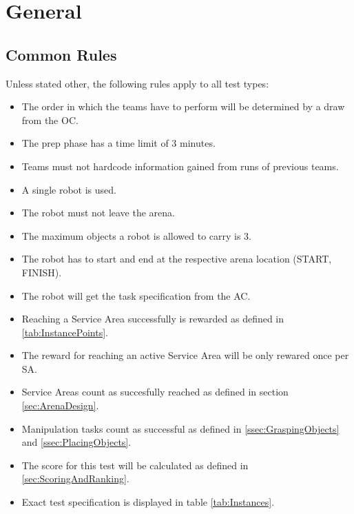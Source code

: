\label{sec:Tests}

\section{General}

\subsection{Common Rules}
\label{ssec: Common Rules}


Unless stated other, the following rules apply to all test types:

\begin{itemize}
\item The order in which the teams have to perform will be determined by a draw from the OC.
\item The prep phase has a time limit of 3 minutes.
\item Teams must not hardcode information gained from runs of previous teams.
\item A single robot is used.
\item The robot must not leave the arena.
\item The maximum objects a robot is allowed to carry is 3.
\item The robot has to start and end at the respective arena location (START, FINISH).
\item The robot will get the task specification from the AC.
\item Reaching a Service Area successfully is rewarded as defined in \ref{tab:InstancePoints}.
\item The reward for reaching an active Service Area will be only rewared once per SA.
\item Service Areas count as succesfully reached as defined in section \ref{sec:ArenaDesign}.
\item Manipulation tasks count as successful as defined in \ref{ssec:GraspingObjects} and \ref{ssec:PlacingObjects}.
\item The score for this test will be calculated as defined in \ref{sec:ScoringAndRanking}.
\item Exact test specification is displayed in table \ref{tab:Instances}.
\end{itemize}






